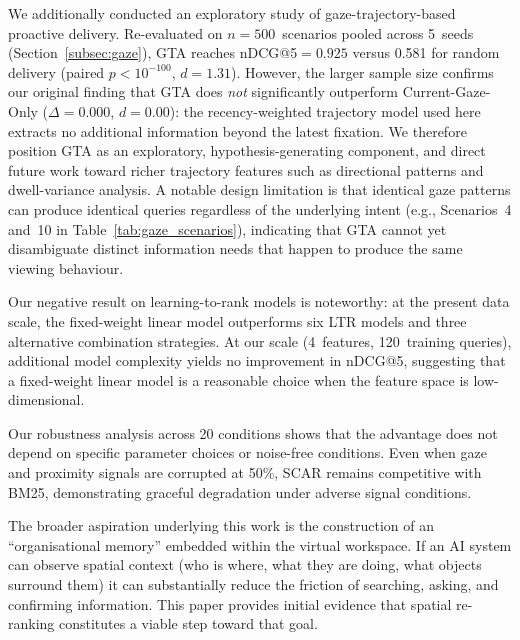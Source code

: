 \documentclass[journal]{IEEEtran}
\begin{document}
We additionally conducted an exploratory study of gaze-trajectory-based
proactive delivery. Re-evaluated on $n{=}500$~scenarios pooled across 5~seeds
(Section~\ref{subsec:gaze}), GTA reaches nDCG@5${=}0.925$ versus 0.581 for
random delivery (paired $p < 10^{-100}$, $d = 1.31$). However, the larger
sample size confirms our original finding that GTA does \emph{not}
significantly outperform Current-Gaze-Only ($\Delta = 0.000$, $d = 0.00$):
the recency-weighted trajectory model used here extracts no additional
information beyond the latest fixation. We therefore position GTA as an
exploratory, hypothesis-generating component, and direct future work toward
richer trajectory features such as directional patterns and dwell-variance
analysis. A notable design limitation is that identical gaze patterns can
produce identical queries regardless of the underlying intent
(e.g., Scenarios~4 and~10 in Table~\ref{tab:gaze_scenarios}), indicating
that GTA cannot yet disambiguate distinct information needs that happen to
produce the same viewing behaviour.

Our negative result on learning-to-rank models is noteworthy: at the present data scale, the fixed-weight linear model outperforms six LTR models and three alternative combination strategies.
At our scale (4~features, 120~training queries), additional model complexity yields no improvement in nDCG@5, suggesting that a fixed-weight linear model is a reasonable choice when the feature space is low-dimensional.

Our robustness analysis across 20 conditions shows that the advantage does not depend on specific parameter choices or noise-free conditions.
Even when gaze and proximity signals are corrupted at 50\%, SCAR remains competitive with BM25, demonstrating graceful degradation under adverse signal conditions.

The broader aspiration underlying this work is the construction of an ``organisational memory'' embedded within the virtual workspace.
If an AI system can observe spatial context (who is where, what they are doing, what objects surround them) it can substantially reduce the friction of searching, asking, and confirming information.
This paper provides initial evidence that spatial re-ranking constitutes a viable step toward that goal.
\end{document}
